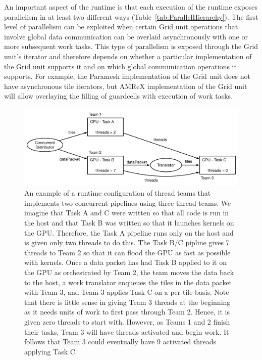 \documentclass{article}
\begin{document}
An important aspect of the runtime is that each execution of the runtime exposes
parallelism in at least two different ways (Table~\ref{tab:ParallelHierarchy}).
The first level of parallelism can be exploited when certain Grid unit
operations that involve global data communication can be overlaid asynchronously
with one or more subsequent work tasks.  This type of parallelism is exposed
through the Grid unit's iterator and therefore depends on whether a particular
implementation of the Grid unit supports it and on which global communication
operations it supports.  For example, the Paramesh implementation of the Grid
unit does not have asynchronous tile iterators, but AMReX implementation of the
Grid unit will allow overlaying the filling of guardcells with execution of work
tasks.\\

\begin{figure}[!ht]
\begin{center}
\includegraphics[width=5.5in]{ConcurrentItorExample.pdf}
\caption[]{An example of a runtime configuration of thread teams that implements
two concurrent pipelines using three thread teams.  We imagine that Task A and C
were written so that all code is run in the host and that Task B was written so
that it launches kernels on the GPU.  Therefore, the Task A pipeline runs
only on the host and is given only two threads to do this.  The Task B/C
pipline gives 7 threads to Team 2 so that it can flood the GPU as fast as possible with
kernels.  Once a data packet has had Task B applied to it on the GPU as
orchestrated by Team 2, the team moves the data back to the host, a work
translator enqueues the tiles in the data packet with Team 3, and Team 3 applies
Task C on a per-tile basis.  Note that there is little sense in giving Team 3
threads at the beginning as it needs units of work to first pass through Team 2.
Hence, it is given zero threads to start with.  However, as Teams 1 and 2 finish
their tasks, Team 3 will have threads activated and begin work.  It follows that
Team 3 could eventually have 9 activated threads applying Task C.}
\label{fig:ConcurrentItor}
\end{center}
\end{figure}
\end{document}
